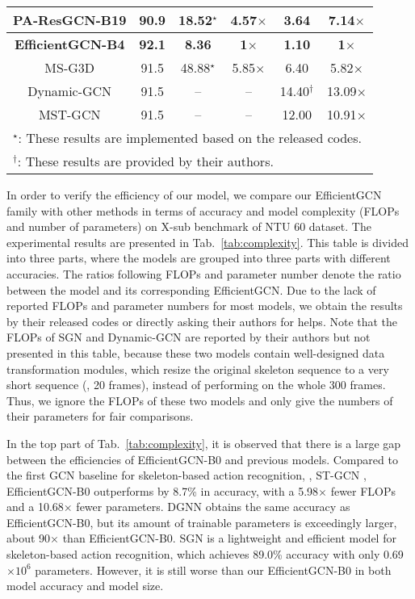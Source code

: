 \documentclass[10pt,journal,compsoc]{IEEEtran}
\begin{document}
\begin{table}[t]
\begin{tabular}{cc|cc|cc}
  PA-ResGCN-B19 \cite{song2020stronger} & 90.9 & 18.52$^\star$ & 4.57$\times$ & 3.64 & 7.14$\times$ \\
  \midrule
  {\bf EfficientGCN-B4} & {\bf 92.1} & {\bf 8.36} & {\bf 1$\times$} & {\bf 1.10} & {\bf 1$\times$} \\
  MS-G3D \cite{liu2020disentangling} & 91.5 & 48.88$^\star$ & 5.85$\times$ & 6.40 & 5.82$\times$ \\
  Dynamic-GCN \cite{ye2020dynamic} & 91.5 & -- & -- & 14.40$^\dagger$ & 13.09$\times$ \\
  MST-GCN \cite{chen2021multi} & 91.5 & -- & -- & 12.00 & 10.91$\times$ \\
  \bottomrule
  \multicolumn{6}{l}{$^\star$: These results are implemented based on the released codes.}\\
  \multicolumn{6}{l}{$^\dagger$: These results are provided by their authors.}\\
  \end{tabular}
\end{table}

In order to verify the efficiency of our model, we compare our EfficientGCN family with other methods in terms of accuracy and model complexity (FLOPs and number of parameters) on X-sub benchmark of NTU 60 dataset. The experimental results are presented in Tab.~\ref{tab:complexity}. This table is divided into three parts, where the models are grouped into three parts with different accuracies. The ratios following FLOPs and parameter number denote the ratio between the model and its corresponding EfficientGCN. Due to the lack of reported FLOPs and parameter numbers for most models, we obtain the results by their released codes or directly asking their authors for helps. Note that the FLOPs of SGN \cite{zhang2020semantics} and Dynamic-GCN \cite{ye2020dynamic} are reported by their authors but not presented in this table, because these two models contain well-designed data transformation modules, which resize the original skeleton sequence to a very short sequence (\eg, 20 frames), instead of performing on the whole 300 frames. Thus, we ignore the FLOPs of these two models and only give the numbers of their parameters for fair comparisons.

In the top part of Tab.~\ref{tab:complexity}, it is observed that there is a large gap between the efficiencies of EfficientGCN-B0 and previous models. Compared to the first GCN baseline for skeleton-based action recognition, \ie, ST-GCN \cite{yan2018spatial}, EfficientGCN-B0 outperforms by 8.7\% in accuracy, with a 5.98$\times$ fewer FLOPs and a 10.68$\times$ fewer parameters. DGNN \cite{shi2019skeleton} obtains the same accuracy as EfficientGCN-B0, but its amount of trainable parameters is exceedingly larger, about 90$\times$ than EfficientGCN-B0. SGN \cite{zhang2020semantics} is a lightweight and efficient model for skeleton-based action recognition, which achieves 89.0\% accuracy with only 0.69$\times10^6$ parameters. However, it is still worse than our EfficientGCN-B0 in both model accuracy and model size.
\end{document}
